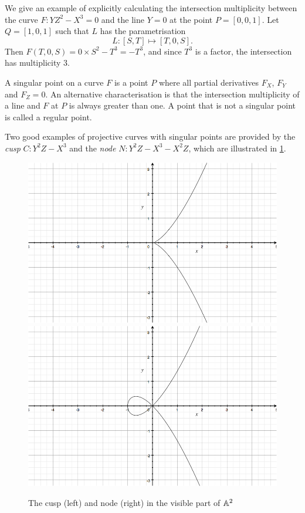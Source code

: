 We give an example of explicitly calculating the intersection multiplicity between the curve $F: YZ^2-X^3=0$ and the line $Y=0$ at the point $P = [0,0,1]$.
Let $Q = [1,0,1]$ such that $L$ has the parametrisation
$$L : [S,T] \mapsto [T,0,S].$$
Then $F(T,0,S) = 0\times S^2 - T^3 = -T^3$, and since $T^3$ is a factor, the intersection has multiplicity 3.
\begin{definition}
	A singular point on a curve $F$ is a point $P$ where all partial derivatives $F_X$, $F_Y$ and $F_Z = 0$.
	An alternative characterisation is that the intersection multiplicity of a line and $F$ at $P$ is always greater than one.
	A point that is not a singular point is called a regular point.
\end{definition}
Two good examples of projective curves with singular points are provided by the \emph{cusp} $C : Y^2Z - X^3$ and the \emph{node} $N : Y^2Z - X^3 - X^2Z$, which are illustrated in \cref{cuspandnode}.
\begin{figure}[htbp]
	\centering
	\includegraphics[scale=0.25]{../Figures/cusp.jpg}
	\includegraphics[scale=0.25]{../Figures/node.jpg}
	\caption{The cusp (left) and node (right) in the visible part of $\an[2]$}
	\label{cuspandnode}
\end{figure}
